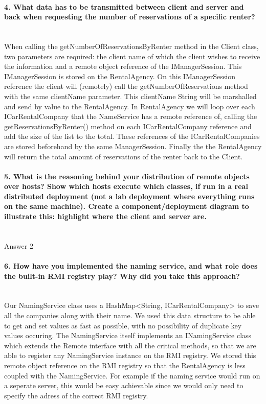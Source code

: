 \documentclass{ds-report}
\begin{document}
	\paragraph{4. What data has to be transmitted between client and server and back when requesting the number of reservations of a specific renter?} \mbox{}\\
When calling the getNumberOfReservationsByRenter method in the Client class, two parameters are required: the client name of which the client wishes to receive the information and a remote object reference of the IManagerSession. This IManagerSession is stored on the RentalAgency. On this IManagerSession reference the client will (remotely) call the getNumberOfReservations method with the same clientName parameter. This clientName String will be marshalled and send by value to the RentalAgency. 
In RentalAgency we will loop over each ICarRentalCompany that the NameService has a remote reference of, calling the getReservationsByRenter() method on each ICarRentalCompany reference and add the size of the list to the total. These references of the ICarRentalCompanies are stored beforehand by the same ManagerSession. 
Finally the the RentalAgency will return the total amount of reservations of the renter back to the Client.

	\paragraph{5. What is the reasoning behind your distribution of remote objects over hosts? Show which
hosts execute which classes, if run in a real distributed deployment (not a lab deployment where
everything runs on the same machine). Create a component/deployment diagram to illustrate this:
highlight where the client and server are.} \mbox{}\\
	Answer 2

	\paragraph{6. How have you implemented the naming service, and what role does the built-in RMI registry play?
Why did you take this approach?} \mbox{}\\
	Our NamingService class uses a HashMap<String, ICarRentalCompany> to save all the companies along with their name. We used this data structure to be able to get and set values as fast as possible, with no possibility of duplicate key values occuring. 
The NamingService itself implements an INamingService class which extends the Remote interface with all the critical methods, so that we are able to register any NamingService instance on the RMI registry. We stored this remote object reference on the RMI registry so that the RentalAgency is less coupled with the NamingService. For example if the naming service would run on a seperate server, this would be easy achievable since we would only need to specify the adress of the correct RMI registry.\\
\end{document}
